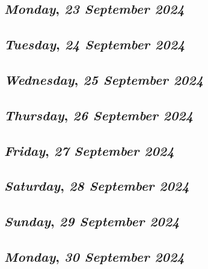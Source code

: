 \def\day{\textit{23 September 2024}}
\def\weekday{\textit{Monday}}
\subsection*{\weekday, \day}

\def\day{\textit{24 September 2024}}
\def\weekday{\textit{Tuesday}}
\subsection*{\weekday, \day}

\def\day{\textit{25 September 2024}}
\def\weekday{\textit{Wednesday}}
\subsection*{\weekday, \day}

\def\day{\textit{26 September 2024}}
\def\weekday{\textit{Thursday}}
\subsection*{\weekday, \day}

\def\day{\textit{27 September 2024}}
\def\weekday{\textit{Friday}}
\subsection*{\weekday, \day}

\def\day{\textit{28 September 2024}}
\def\weekday{\textit{Saturday}}
\subsection*{\weekday, \day}

\def\day{\textit{29 September 2024}}
\def\weekday{\textit{Sunday}}
\subsection*{\weekday, \day}

\def\day{\textit{30 September 2024}}
\def\weekday{\textit{Monday}}
\subsection*{\weekday, \day}